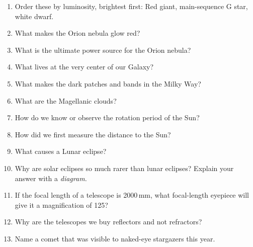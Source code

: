\documentclass{article}
\begin{document}
\begin{enumerate}
\item
Order these by luminosity, brightest first: Red giant, main-sequence G
star, white dwarf.
\item
What makes the Orion nebula glow red?
\item
What is the ultimate power source for the Orion nebula?
\item
What lives at the very center of our Galaxy?
\item
What makes the dark patches and bands in the Milky Way?
\item
What are the Magellanic clouds?
\item
How do we know or observe the rotation period of the Sun?
\item
How did we first measure the distance to the Sun?
\item
What causes a Lunar eclipse?
\item
Why are solar eclipses so much rarer than lunar eclipses?  Explain
your answer with a \emph{diagram.}
\item
If the focal length of a telescope is 2000\,mm, what focal-length
eyepiece will give it a magnification of 125?
\item
Why are the telescopes we buy reflectors and not refractors?
\item
Name a comet that was visible to naked-eye stargazers this year.

\end{enumerate} 
\end{document}
